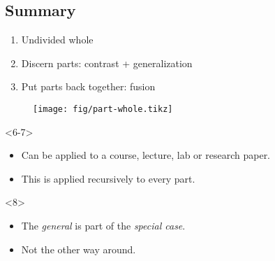 %

\subsection{Summary}

\begin{frame}
  \begin{example}
    \begin{enumerate}
      \item \alert<1>{Undivided whole}
      \item \alert<2>{Discern parts}: \alert<3>{contrast} + 
        \alert<4>{generalization}
      \item Put parts back together: \alert<5>{fusion}
    \end{enumerate}
  \end{example}

  \begin{figure}
    \texttt{[image: fig/part-whole.tikz]}
  \end{figure}

  \begin{onlyenv}<6-7>
    \begin{remark}
      \begin{itemize}
        \item<6> Can be applied to a course, lecture, lab or research paper.
        \item<7> This is applied recursively to every part.
      \end{itemize}
    \end{remark}
  \end{onlyenv}

  \begin{onlyenv}<8>
    \begin{remark}[An implication]
      \begin{itemize}
        \item The \emph{general} is part of the \emph{special case}.
        \item Not the other way around.
      \end{itemize}
    \end{remark}
  \end{onlyenv}
\end{frame}


